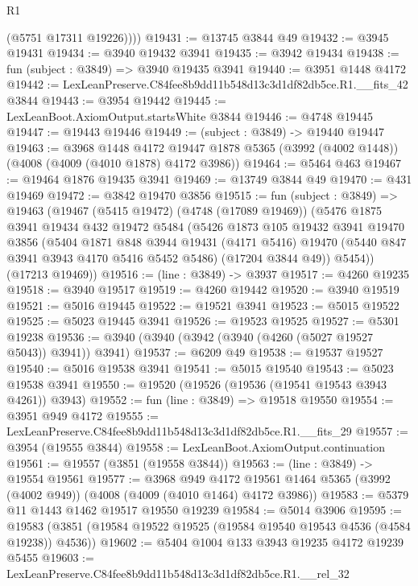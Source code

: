 \begin{lexlean}{R1}
\begin{coremodule}
          (@5751 @17311 @19226))))
@19431 := @13745 @3844 @49
@19432 := @3945 @19431
@19434 := @3940 @19432 @3941
@19435 := @3942 @19434
@19438 := fun (subject : @3849) => @3940 @19435 @3941
@19440 := @3951 @1448 @4172
@19442 := LexLeanPreserve.C84fee8b9dd11b548d13c3d1df82db5ce.R1.__fits_42 @3844
@19443 := @3954 @19442
@19445 := LexLeanBoot.AxiomOutput.startsWhite @3844
@19446 := @4748 @19445
@19447 := @19443 @19446
@19449 := (subject : @3849) -> @19440 @19447
@19463 := @3968
    @1448
    @4172
    @19447
    @1878
    @5365
    (@3992 (@4002 @1448))
    (@4008 (@4009 (@4010 @1878) @4172 @3986))
@19464 := @5464 @463
@19467 := @19464 @1876 @19435 @3941
@19469 := @13749 @3844 @49
@19470 := @431 @19469
@19472 := @3842 @19470 @3856
@19515 := fun (subject : @3849) =>
  @19463
    (@19467
      (@5415 @19472)
      (@4748 (@17089 @19469))
      (@5476
        @1875
        @3941
        @19434
        @432
        @19472
        @5484
        (@5426
          @1873
          @105
          @19432
          @3941
          @19470
          @3856
          (@5404
            @1871
            @848
            @3944
            @19431
            (@4171 @5416)
            @19470
            (@5440 @847 @3941 @3943 @4170 @5416 @5452 @5486)
            (@17204 @3844 @49))
          @5454))
      (@17213 @19469))
@19516 := (line : @3849) -> @3937
@19517 := @4260 @19235
@19518 := @3940 @19517
@19519 := @4260 @19442
@19520 := @3940 @19519
@19521 := @5016 @19445
@19522 := @19521 @3941
@19523 := @5015 @19522
@19525 := @5023 @19445 @3941
@19526 := @19523 @19525
@19527 := @5301 @19238
@19536 := @3940 (@3940 (@3942 (@3940 (@4260 (@5027 @19527 @5043)) @3941)) @3941)
@19537 := @6209 @49
@19538 := @19537 @19527
@19540 := @5016 @19538 @3941
@19541 := @5015 @19540
@19543 := @5023 @19538 @3941
@19550 := @19520 (@19526 (@19536 (@19541 @19543 @3943 @4261)) @3943)
@19552 := fun (line : @3849) => @19518 @19550
@19554 := @3951 @949 @4172
@19555 := LexLeanPreserve.C84fee8b9dd11b548d13c3d1df82db5ce.R1.__fits_29
@19557 := @3954 (@19555 @3844)
@19558 := LexLeanBoot.AxiomOutput.continuation
@19561 := @19557 (@3851 (@19558 @3844))
@19563 := (line : @3849) -> @19554 @19561
@19577 := @3968
    @949
    @4172
    @19561
    @1464
    @5365
    (@3992 (@4002 @949))
    (@4008 (@4009 (@4010 @1464) @4172 @3986))
@19583 := @5379 @11 @1443 @1462 @19517 @19550 @19239
@19584 := @5014 @3906
@19595 := @19583 (@3851 (@19584 @19522 @19525 (@19584 @19540 @19543 @4536 (@4584 @19238)) @4536))
@19602 := @5404 @1004 @133 @3943 @19235 @4172 @19239 @5455
@19603 := LexLeanPreserve.C84fee8b9dd11b548d13c3d1df82db5ce.R1.__rel_32

\end{coremodule}
\end{lexlean}
